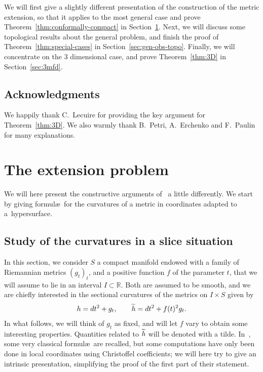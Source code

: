 \documentclass[10pt]{amsart}
\theoremstyle{definition}\newtheorem{defi}[theo]{Definition}\newtheorem{rema}[theo]{Remark}\newtheorem{exam}[theo]{Example}\newtheorem{exem}[theo]{Example}\newtheorem{nota}[theo]{Notation}
\newcommand{\R}{\mathbb{R}}
\theoremstyle{plain}
\let\oldtilde\tilde
\renewcommand*{\tilde}[1]{\mathchoice{\widetilde{#1}}{\widetilde{#1}}{\oldtilde{#1}}{\oldtilde{#1}}}
\begin{document}
We will first give a slightly different presentation of the construction of the metric extension, so that it applies to the most general case and prove Theorem~\ref{thm:conformally-compact} in Section~\ref{sec:metric-extension}. Next, we will discuss some topological results about the general problem, and finish the proof of Theorem~\ref{thm:special-cases} in Section~\ref{sec:gen-obs-topo}. Finally, we will concentrate on the 3 dimensional case, and prove Theorem~\ref{thm:3D} in Section~\ref{sec:3mfd}.

\subsection*{Acknowledgments}

We happily thank C.~Lecuire for providing the key argument for Theorem~\ref{thm:3D}. We also warmly thank B.~Petri, A.~Erchenko and F.~Paulin for many explanations.


\section{The extension problem}
\label{sec:metric-extension}

We will here present the constructive arguments of~\cite{Chen-Erchenko-Gogolev} a little differently. We start by giving formul\ae\ for the curvatures of a metric in coordinates adapted to a~hypersurface.

\subsection{Study of the curvatures in a slice situation}

In this section, we consider $S$ a compact manifold endowed with a family of Riemannian metrics $(g_t)_t$, and a positive function $f$ of the parameter $t$, that we will assume to lie in an interval $I\subset \R$. Both are assumed to be smooth, and we are chiefly interested in the sectional curvatures of the metrics on $I\times S$ given by
\begin{equation}\label{eq:conformal-slice}
h= dt^2 + g_t,\qquad \tilde{h} = dt^2 + f(t)^2 g_t.
\end{equation}
In what follows, we will think of $g_t$ as fixed, and will let $f$ vary to obtain some interesting properties. Quantities related to $\tilde{h}$ will be denoted with a tilde. In~\cite{Chen-Erchenko-Gogolev}, some very classical formul\ae\ are recalled, but some computations have only been done in local coordinates using Christoffel coefficients; we will here try to give an intrinsic presentation, simplifying the proof of the first part of their statement.
\end{document}
